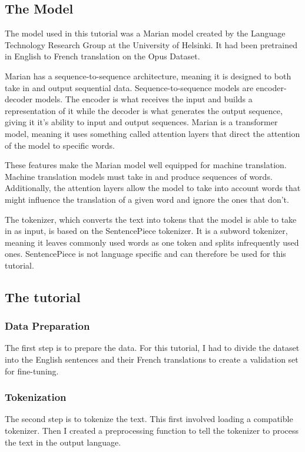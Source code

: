\documentclass[10pt,twocolumn]{article}
\begin{document}
\subsection{The Model}
The model used in this tutorial was a Marian model created by the Language Technology Research Group at the University of Helsinki. It had been pretrained in English to French translation on the Opus Dataset. 

Marian has a sequence-to-sequence architecture, meaning it is designed to both take in and output sequential data. Sequence-to-sequence models are encoder-decoder models. The encoder is what receives the input and builds a representation of it while the decoder is what generates the output sequence, giving it it's ability to input and output sequences. Marian is a transformer model, meaning it uses something called attention layers that direct the attention of the model to specific words. 

These features make the Marian model well equipped for machine translation. Machine translation models must take in and produce sequences of words. Additionally, the attention layers allow the model to take into account words that might influence the translation of a given word and ignore the ones that don't. 

The tokenizer, which converts the text into tokens that the model is able to take in as input, is based on the SentencePiece tokenizer. It is a subword tokenizer, meaning it leaves commonly used words as one token and splits infrequently used ones. SentencePiece is not language specific and can therefore be used for this tutorial.

\subsection{The tutorial}
\subsubsection{Data Preparation}
The first step is to prepare the data. For this tutorial, I had to divide the dataset into the English sentences and their French translations to create a validation set for fine-tuning. 

\subsubsection{Tokenization}
The second step is to tokenize the text. This first involved loading a compatible tokenizer. Then I created a preprocessing function to tell the tokenizer to process the text in the output language.
\end{document}
